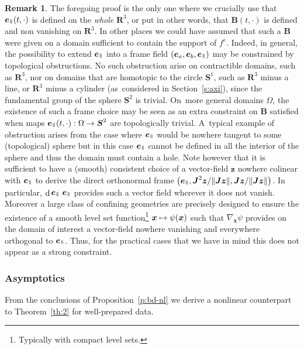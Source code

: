 \documentclass[JEP,XML,SOM,Unicode]{cedram}
\newcommand\mto{\mathchoice{\longmapsto}{\mapsto}{\mapsto}{\mapsto}}
\let\eps\varepsilon
\DeclareMathOperator\dD{d}\let\dd\dD
\theoremstyle{plain}
\theoremstyle{definition}
\newtheorem{remark}[theorem]{Remark}
\newcommand\br{\begin{remark}}
\newcommand\er{\end{remark}}
\newcommand\R{\mathbf R}
\newcommand\bB{{\boldsymbol B}}
\newcommand\bJ{{\boldsymbol J}}
\newcommand\bS{{\boldsymbol S}}
\newcommand\bfx{{\boldsymbol x}}
\newcommand\bfz{{\boldsymbol z}}
\DeclareMathOperator{\beD}{\boldsymbol{e}}
\newcommand\eDpar{\beD_\mypar}
\newcommand\eDa{\beD_a}
\newcommand\eDb{\beD_b}
\newcommand{\mypar}{{\mkern3mu\vphantom{\perp}\vrule depth 0pt\mkern2mu\vrule depth 0pt\mkern3mu}}
\begin{document}
\br\label{rk:frame}
The foregoing proof is the only one where we crucially use that $\eDpar(t,\cdot)$
is defined on the \emph{whole} $\R^3$, or put in other words, that $\bB(t,\cdot)$ is defined and non vanishing on $\R^3$. In other places we could have assumed that such a $\bB$ were given on a domain sufficient to contain the support of $f^\eps$. Indeed, in general, the possibility to extend $\eDpar$ into a frame field $(\eDa,\eDb,\eDpar)$ may be constrained by topological obstructions. No such obstruction arise on contractible domains, such as $\R^3$, nor on domains that are homotopic to the circle $\bS^1$, such as $\R^3$ minus a line, or $\R^3$ minus a cylinder (as~considered in Section~\ref{s:axi}), since the fundamental group of the sphere $\bS^2$ is trivial. On~more general domains $\Omega$, the existence of such a frame choice may be seen as an extra constraint on $\bB$ satisfied when maps $\eDpar (t,\cdot):\Omega\to\bS^2$ are topologically trivial. A~typical example of obstruction arises from the case where $\eDpar$ would be nowhere tangent to some (topological) sphere but in this case $\eDpar$ cannot be defined in all the interior of the sphere and thus the domain must contain a hole. Note however that it is sufficient to have a (smooth) consistent choice of a vector-field $\bfz$ nowhere colinear with $\eDpar$ to derive the direct orthonormal frame $\left(\eDpar,\bJ^2\bfz/\|\bJ\bfz\|,\bJ\bfz/\|\bJ\bfz\|\right)$. In particular, $\dD\eDpar\,\eDpar$ provides such a vector field wherever it does not vanish. Moreover a large class of confining geometries are precisely designed to ensure the existence of a smooth level set function\footnote{Typically with compact level sets.} $\bfx\mto \psi(\bfx)$ such that $\nabla_\bfx\psi$ provides on the domain of interest a vector-field nowhere vanishing and everywhere orthogonal to $\eDpar$. Thus, for the practical cases that we have in mind this does not appear as a strong constraint.
\er

\subsubsection{Asymptotics}

From the conclusions of Proposition~\ref{p:bd-nl} we derive a nonlinear counterpart to Theorem~\ref{th:2} for well-prepared data.
\end{document}
